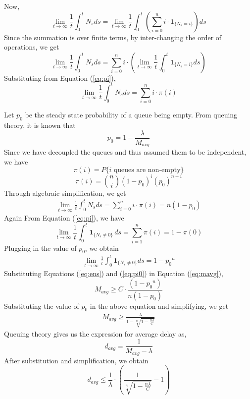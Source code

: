 \documentclass[10pt, conference, compsocconf]{IEEEtran}
\begin{document}
\noindent
Now, 
$$\lim_{t \to \infty} \frac{1}{t} \int^t_0 N_s  ds  = \lim_{t \to \infty} \frac{1}{t} \int^t_0 \left( \sum^n_{i=0} i \cdot \boldsymbol 1_{\{N_s = i\}} \right) ds$$
Since the summation is over finite terms, by inter-changing the order of operations, we get
$$\lim_{t \to \infty} \frac{1}{t} \int^t_0 N_s  ds  = \sum^n_{i=0} i \cdot \left( \lim_{t \to \infty} \frac{1}{t} \int^t_0 \boldsymbol 1_{\{N_s = i\}} ds \right)$$
Substituting from Equation (\ref{eq:pi}),
$$\lim_{t \to \infty} \frac{1}{t} \int^t_0 N_s  ds  = \sum^n_{i=0} i \cdot \pi(i)$$

\noindent
Let $p_0$ be the steady state probability of a queue being empty. From queuing theory, it is known that
$$p_0 = 1 - \frac{\lambda}{M_{avg}}$$ 
Since we have decoupled the queues and thus assumed them to be independent, we have
$$\pi(i) = P\{i \textrm{ queues are non-empty} \}$$
$$\pi(i) = \binom{n}{i} (1-p_0)^i (p_0)^{n-i}$$
Through algebraic simplification, we get
\begin{eqnarray} \label{eq:ens}
\lim_{t \to \infty} \frac{1}{t} \int^t_0 N_s  ds = \sum^n_{i=0} i \cdot \pi(i) = n(1-p_0)
\end{eqnarray}
Again From Equation (\ref{eq:pi}), we have
$$ \lim_{t \to \infty} \frac{1}{t} \int^t_0 \boldsymbol 1_{\{N_s \neq 0\}} \, ds  = \sum^n_{i=1} \pi(i) = 1 - \pi(0)$$
Plugging in the value of $p_0$, we obtain
\begin{eqnarray} \label{eq:pi0}
\lim_{t \to \infty} \frac{1}{t} \int^t_0 \boldsymbol 1_{\{N_s \neq 0\}}  ds  = 1 - {p_0}^n
\end{eqnarray}
Substituting Equations (\ref{eq:ens}) and (\ref{eq:pi0}) in Equation (\ref{eq:mavg}), 
$$M_{avg} \geq C \cdot \frac{(1-{p_0}^n)}{n(1-p_0)}$$
Substituting the value of $p_0$ in the above equation and simplifying, we get
\begin{eqnarray} \label{eq:hpp}
M_{avg} \geq \frac{\lambda}{1 - \sqrt[n]{1-\frac{n\lambda}{C}} } 
\end{eqnarray}
Queuing theory gives us the expression for average delay as,
$$d_{avg} = \frac{1}{M_{avg}-\lambda} $$
After substitution and simplification, we obtain
$$d_{avg} \leq \frac{1}{\lambda} \cdot \left(\frac{1}{\sqrt[n]{1-\frac{n\lambda}{C}}}  - 1 \right) $$
\end{document}

